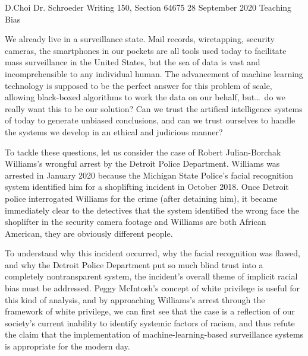 \documentclass[12pt, letterpaper]{article}
\newcommand{\comment}[1]{}
\begin{document}
\begin{mla}
	{D.}{Choi}
	{Dr. Schroeder}
	{Writing 150, Section 64675}
	{28 September 2020}
	{Teaching Bias}


\comment{
The technology of the modern day is brilliant and terrifying. The tools
available to humanity now can have consequences on a previously unimaginable
scale\textemdash{we} can power the world with electricity, and in the process
destroy the ecosphere. We can inquire into the particle nature of the
universe, and use that knowledge to create mass-murder weapons. We can try to
teach artificial intelligence to detect and predict criminal activity, and
inadvertently establish an impenetrable surveillance state.
}

We already live in a surveillance state. Mail records, wiretapping, security
cameras, the smartphones in our pockets are all tools used
today to facilitate mass surveillance in the United States, but the sea of
data is vast and incomprehensible to any individual human. The advancement of
machine learning technology is supposed to be the perfect answer for this
problem of scale, allowing black-boxed algorithms to work the data on our
behalf, but\ldots\ do we really want this to be our solution? Can we trust
the artifical intelligence systems of today to generate unbiased conclusions,
and can we trust ourselves to handle the systems we develop in an ethical
and judicious manner?

To tackle these questions, let us consider the case of
Robert Julian-Borchak Williams's wrongful arrest by the Detroit Police
Department. Williams was arrested in January 2020 because the Michigan State
Police's facial recognition system identified him for a shoplifting incident
in October 2018. Once Detroit police interrogated Williams for the crime
(after detaining him), it became immediately clear to the detectives that the
system identified the wrong face the shoplifter in the
security camera footage and Williams are both African American, they are
obviously different people.

To understand why this incident occurred, why the facial recognition was
flawed, and why the Detroit Police Department put so much blind trust into a
completely nontransparent system, the incident's overall theme of implicit
racial bias must be addressed. Peggy McIntosh's concept of white privilege is
useful for this kind of analysis, and by approaching Williams's arrest through
the framework of white privilege, we can first see that the case is a
reflection of our society's current inability to identify systemic factors of
racism, and thus refute the claim that the implementation of
machine-learning-based surveillance systems is appropriate for the modern day.


\end{mla}
\end{document}
